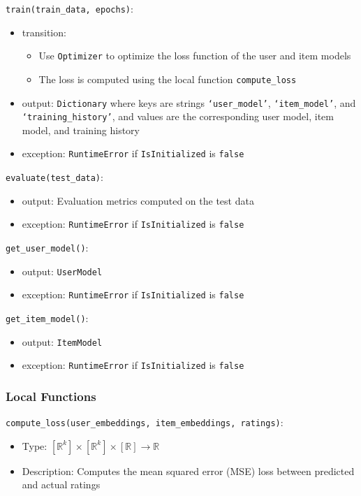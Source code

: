 \documentclass[12pt, titlepage]{article}
\begin{document}
\noindent \texttt{train(train\_data, epochs)}:
\begin{itemize}
\item transition:
\begin{itemize}
  \item Use \texttt{Optimizer} to optimize the loss function of the user and item models
  \item The loss is computed using the local function \texttt{compute\_loss}
\end{itemize}
\item output: \texttt{Dictionary} where keys are strings \texttt{`user\_model'}, \texttt{`item\_model'}, and \texttt{`training\_history'}, and values are the corresponding user model, item model, and training history
\item exception: \texttt{RuntimeError} if \texttt{IsInitialized} is \texttt{false}
\end{itemize}

\noindent \texttt{evaluate(test\_data)}:
\begin{itemize}
\item output: Evaluation metrics computed on the test data
\item exception: \texttt{RuntimeError} if \texttt{IsInitialized} is \texttt{false}
\end{itemize}

\noindent \texttt{get\_user\_model()}:
\begin{itemize}
\item output: \texttt{UserModel}
\item exception: \texttt{RuntimeError} if \texttt{IsInitialized} is \texttt{false}
\end{itemize}

\noindent \texttt{get\_item\_model()}:
\begin{itemize}
\item output: \texttt{ItemModel}
\item exception: \texttt{RuntimeError} if \texttt{IsInitialized} is \texttt{false}
\end{itemize}

\subsubsection{Local Functions}

\noindent \texttt{compute\_loss(user\_embeddings, item\_embeddings, ratings)}:
\begin{itemize}
\item Type: $[\mathbb{R}^k] \times [\mathbb{R}^k] \times [\mathbb{R}] \rightarrow \mathbb{R}$
\item Description: Computes the mean squared error (MSE) loss between predicted and actual ratings
\end{itemize}
\end{document}
